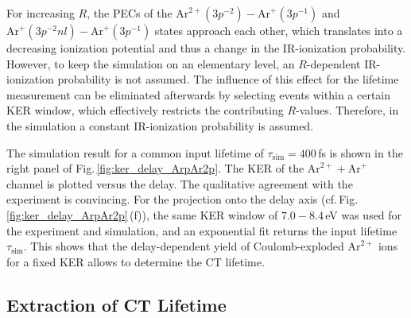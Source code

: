 \documentclass[%
 aip,
rsi,%
 amsmath,amssymb,
preprint,%
]{revtex4-1}
\begin{document}
For increasing $R$, the PECs of the $\mathrm{Ar}^{2+}(3p^{-2}) - \mathrm{Ar}^+(3p^{-1})$ and $\mathrm{Ar}^{+}(3p^{-2}nl) - \mathrm{Ar}^+(3p^{-1})$ states approach each other, which translates into a decreasing ionization potential and thus a change in the IR-ionization probability. However, to keep the simulation on an elementary level, an $R$-dependent IR-ionization probability is not assumed. The influence of this effect for the lifetime measurement can be eliminated afterwards by selecting events within a certain KER window, which effectively restricts the contributing $R$-values. Therefore, in the simulation a constant IR-ionization probability is assumed. 

The simulation result for a common input lifetime of $\tau_{\mathrm{sim}} = 400$\,fs is shown in the right panel of Fig.\,\ref{fig:ker_delay_ArpAr2p}. The KER of the $ \mathrm{Ar}^{2+} + \mathrm{Ar}^+$ channel is plotted versus the delay. The qualitative agreement with the experiment is convincing. For the projection onto the delay axis (cf.\,Fig.\,\ref{fig:ker_delay_ArpAr2p}\,(f)), the same KER window of $7.0-8.4$\,eV  was used for the experiment and simulation, and an exponential fit returns the input lifetime $\tau_{\mathrm{sim}}$. This shows that the delay-dependent yield of Coulomb-exploded $\mathrm{Ar}^{2+}$ ions for a fixed KER allows to determine the CT lifetime.

 \subsection{Extraction of CT Lifetime}
  \label{sec:extraction}
\end{document}

